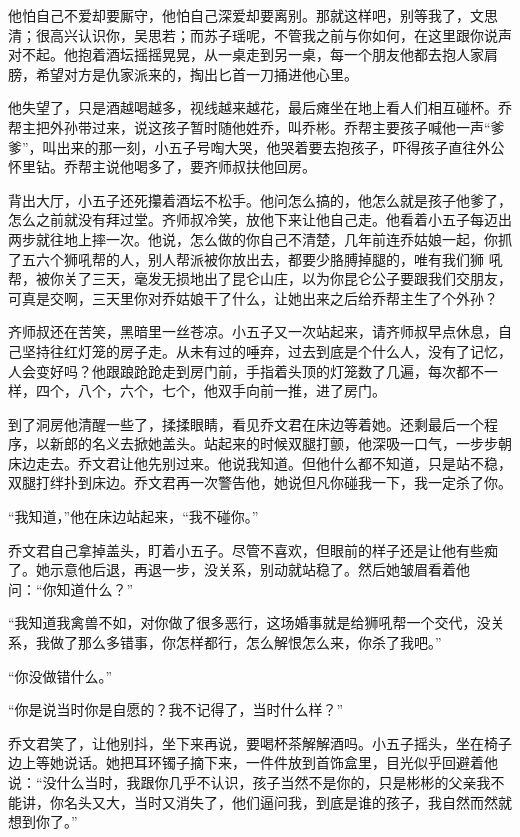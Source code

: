 他怕自己不爱却要厮守，他怕自己深爱却要离别。那就这样吧，别等我了，文思清；很高兴认识你，吴思若；而苏子瑶呢，不管我之前与你如何，在这里跟你说声对不起。他抱着酒坛摇摇晃晃，从一桌走到另一桌，每一个朋友他都去抱人家肩膀，希望对方是仇家派来的，掏出匕首一刀捅进他心里。

他失望了，只是酒越喝越多，视线越来越花，最后瘫坐在地上看人们相互碰杯。乔帮主把外孙带过来，说这孩子暂时随他姓乔，叫乔彬。乔帮主要孩子喊他一声“爹爹”，叫出来的那一刻，小五子号啕大哭，他哭着要去抱孩子，吓得孩子直往外公怀里钻。乔帮主说他喝多了，要齐师叔扶他回房。

背出大厅，小五子还死攥着酒坛不松手。他问怎么搞的，他怎么就是孩子他爹了，怎么之前就没有拜过堂。齐师叔冷笑，放他下来让他自己走。他看着小五子每迈出两步就往地上摔一次。他说，怎么做的你自己不清楚，几年前连乔姑娘一起，你抓了五六个狮吼帮的人，别人帮派被你放出去，都要少胳膊掉腿的，唯有我们狮
吼帮，被你关了三天，毫发无损地出了昆仑山庄，以为你昆仑公子要跟我们交朋友，可真是交啊，三天里你对乔姑娘干了什么，让她出来之后给乔帮主生了个外孙？

齐师叔还在苦笑，黑暗里一丝苍凉。小五子又一次站起来，请齐师叔早点休息，自己坚持往红灯笼的房子走。从未有过的唾弃，过去到底是个什么人，没有了记忆，人会变好吗？他跟踉跄跄走到房门前，手指着头顶的灯笼数了几遍，每次都不一样，四个，八个，六个，七个，他双手向前一推，进了房门。

到了洞房他清醒一些了，揉揉眼睛，看见乔文君在床边等着她。还剩最后一个程序，以新郎的名义去掀她盖头。站起来的时候双腿打颤，他深吸一口气，一步步朝床边走去。乔文君让他先别过来。他说我知道。但他什么都不知道，只是站不稳，双腿打绊扑到床边。乔文君再一次警告他，她说但凡你碰我一下，我一定杀了你。

“我知道，”他在床边站起来，“我不碰你。”

乔文君自己拿掉盖头，盯着小五子。尽管不喜欢，但眼前的样子还是让他有些痴了。她示意他后退，再退一步，没关系，别动就站稳了。然后她皱眉看着他问：“你知道什么？”

“我知道我禽兽不如，对你做了很多恶行，这场婚事就是给狮吼帮一个交代，没关系，我做了那么多错事，你怎样都行，怎么解恨怎么来，你杀了我吧。”

“你没做错什么。”

“你是说当时你是自愿的？我不记得了，当时什么样？”

乔文君笑了，让他别抖，坐下来再说，要喝杯茶解解酒吗。小五子摇头，坐在椅子边上等她说话。她把耳环镯子摘下来，一件件放到首饰盒里，目光似乎回避着他说：“没什么当时，我跟你几乎不认识，孩子当然不是你的，只是彬彬的父亲我不能讲，你名头又大，当时又消失了，他们逼问我，到底是谁的孩子，我自然而然就想到你了。”
\newline

